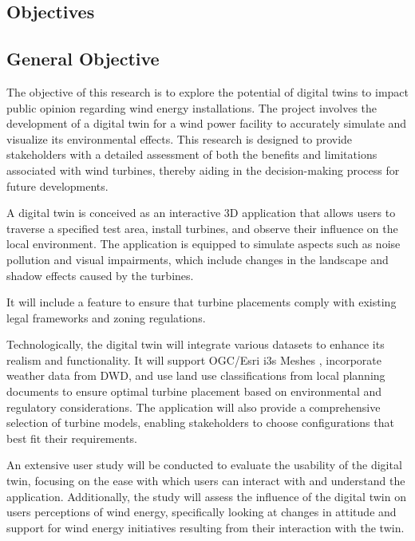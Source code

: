 \documentclass[11pt, titlepage, a4paper]{scrartcl}
\begin{document}
\begin{linenumbers}
    \section{Objectives}
    \subsection{General Objective}
    The objective of this research is to explore the potential of digital twins to impact public opinion regarding wind energy installations. The project involves the development of a digital twin for a wind power facility to accurately simulate and visualize its environmental effects. This research is designed to provide stakeholders with a detailed assessment of both the benefits and limitations associated with wind turbines, thereby aiding in the decision-making process for future developments.

    A digital twin is conceived as an interactive 3D application that allows users to traverse a specified test area, install turbines, and observe their influence on the local environment. The application is equipped to simulate aspects such as noise pollution and visual impairments, which include changes in the landscape and shadow effects caused by the turbines.

    It will include a feature to ensure that turbine placements comply with existing legal frameworks and zoning regulations.

    Technologically, the digital twin will integrate various datasets to enhance its realism and functionality. It will support OGC/Esri i3s Meshes \cite{esriincI3sspec}, incorporate weather data from DWD, and use land use classifications from local planning documents %
    to ensure optimal turbine placement based on environmental and regulatory considerations. The application will also provide a comprehensive selection of turbine models, enabling stakeholders to choose configurations that best fit their requirements.

    An extensive user study will be conducted to evaluate the usability of the digital twin, focusing on the ease with which users can interact with and understand the application. Additionally, the study will assess the influence of the digital twin on users perceptions of wind energy, specifically looking at changes in attitude and support for wind energy initiatives resulting from their interaction with the twin.






\end{linenumbers}
\end{document}
